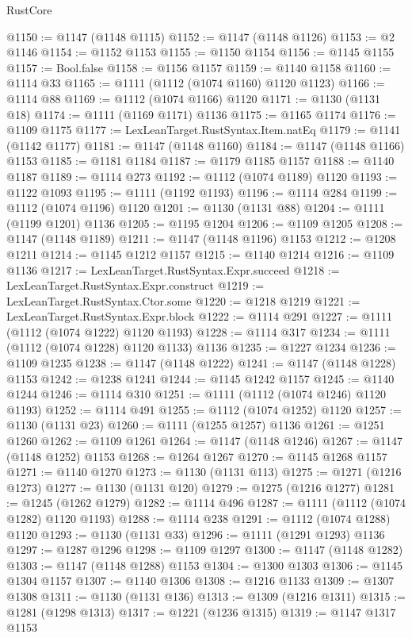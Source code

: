 \begin{lexlean}{RustCore}
\begin{coremodule}
@1150 := @1147 (@1148 @1115)
@1152 := @1147 (@1148 @1126)
@1153 := @2 @1146
@1154 := @1152 @1153
@1155 := @1150 @1154
@1156 := @1145 @1155
@1157 := Bool.false
@1158 := @1156 @1157
@1159 := @1140 @1158
@1160 := @1114 @33
@1165 := @1111 (@1112 (@1074 @1160) @1120 @1123)
@1166 := @1114 @88
@1169 := @1112 (@1074 @1166) @1120
@1171 := @1130 (@1131 @18)
@1174 := @1111 (@1169 @1171) @1136
@1175 := @1165 @1174
@1176 := @1109 @1175
@1177 := LexLeanTarget.RustSyntax.Item.natEq
@1179 := @1141 (@1142 @1177)
@1181 := @1147 (@1148 @1160)
@1184 := @1147 (@1148 @1166) @1153
@1185 := @1181 @1184
@1187 := @1179 @1185 @1157
@1188 := @1140 @1187
@1189 := @1114 @273
@1192 := @1112 (@1074 @1189) @1120
@1193 := @1122 @1093
@1195 := @1111 (@1192 @1193)
@1196 := @1114 @284
@1199 := @1112 (@1074 @1196) @1120
@1201 := @1130 (@1131 @88)
@1204 := @1111 (@1199 @1201) @1136
@1205 := @1195 @1204
@1206 := @1109 @1205
@1208 := @1147 (@1148 @1189)
@1211 := @1147 (@1148 @1196) @1153
@1212 := @1208 @1211
@1214 := @1145 @1212 @1157
@1215 := @1140 @1214
@1216 := @1109 @1136
@1217 := LexLeanTarget.RustSyntax.Expr.succeed
@1218 := LexLeanTarget.RustSyntax.Expr.construct
@1219 := LexLeanTarget.RustSyntax.Ctor.some
@1220 := @1218 @1219
@1221 := LexLeanTarget.RustSyntax.Expr.block
@1222 := @1114 @291
@1227 := @1111 (@1112 (@1074 @1222) @1120 @1193)
@1228 := @1114 @317
@1234 := @1111 (@1112 (@1074 @1228) @1120 @1133) @1136
@1235 := @1227 @1234
@1236 := @1109 @1235
@1238 := @1147 (@1148 @1222)
@1241 := @1147 (@1148 @1228) @1153
@1242 := @1238 @1241
@1244 := @1145 @1242 @1157
@1245 := @1140 @1244
@1246 := @1114 @310
@1251 := @1111 (@1112 (@1074 @1246) @1120 @1193)
@1252 := @1114 @491
@1255 := @1112 (@1074 @1252) @1120
@1257 := @1130 (@1131 @23)
@1260 := @1111 (@1255 @1257) @1136
@1261 := @1251 @1260
@1262 := @1109 @1261
@1264 := @1147 (@1148 @1246)
@1267 := @1147 (@1148 @1252) @1153
@1268 := @1264 @1267
@1270 := @1145 @1268 @1157
@1271 := @1140 @1270
@1273 := @1130 (@1131 @113)
@1275 := @1271 (@1216 @1273)
@1277 := @1130 (@1131 @120)
@1279 := @1275 (@1216 @1277)
@1281 := @1245 (@1262 @1279)
@1282 := @1114 @496
@1287 := @1111 (@1112 (@1074 @1282) @1120 @1193)
@1288 := @1114 @238
@1291 := @1112 (@1074 @1288) @1120
@1293 := @1130 (@1131 @33)
@1296 := @1111 (@1291 @1293) @1136
@1297 := @1287 @1296
@1298 := @1109 @1297
@1300 := @1147 (@1148 @1282)
@1303 := @1147 (@1148 @1288) @1153
@1304 := @1300 @1303
@1306 := @1145 @1304 @1157
@1307 := @1140 @1306
@1308 := @1216 @1133
@1309 := @1307 @1308
@1311 := @1130 (@1131 @136)
@1313 := @1309 (@1216 @1311)
@1315 := @1281 (@1298 @1313)
@1317 := @1221 (@1236 @1315)
@1319 := @1147 @1317 @1153

\end{coremodule}
\end{lexlean}
